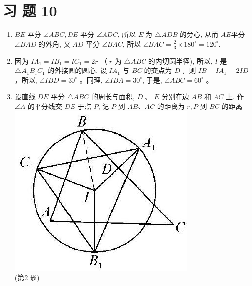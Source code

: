 \documentclass[10pt]{article}
\begin{document}
\section*{习 题 10}
\begin{enumerate}
  \item $B E$ 平分 $\angle A B C, D E$ 平分 $\angle A D C$, 所以 $E$ 为 $\triangle A D B$ 的旁心, 从而 $A E$平分 $\angle B A D$ 的外角, 又 $A D$ 平分 $\angle B A C$, 所以 $\angle B A C=\frac{2}{3} \times 180^{\circ}=120^{\circ}$.
  \item 因为 $I A_{1}=I B_{1}=I C_{1}=2 r$ （ $r$ 为 $\triangle A B C$ 的内切圆半径), 所以, $I$ 是 $\triangle A_{1} B_{1} C_{1}$ 的外接圆的圆心. 设 $I A_{1}$ 与 $B C$ 的交点为 $D$ ，则 $I B=I A_{1}=2 I D$ ，所以, $\angle I B D=30^{\circ}$ 。同理, $\angle I B A=30^{\circ}$, 于是, $\angle A B C=60^{\circ}$ 。
  \item 设直线 $D E$ 平分 $\triangle A B C$ 的周长与面积, $D$ 、 $E$ 分别在边 $A B$ 和 $A C$ 上. 作 $\angle A$ 的平分线交 $D E$ 于点 $P$, 记 $P$ 到 $A B 、 A C$ 的距离为 $r, P$ 到 $B C$ 的距离\\
\includegraphics[max width=\textwidth, center]{2024_10_30_66b8e5e701da2093c133g-104(1)}\\
(第2 题)
\end{enumerate}
\end{document}
